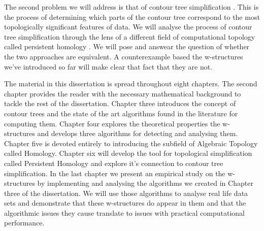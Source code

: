 The second problem we will address is that of contour tree simplification \cite{ct-branch-decomp}. This is the process of determining which parts of the contour tree correspond to the most topologically significant features of data. We will analyse the process of contour tree simplification through the lens of a different field of computational topology called persistent homology \cite{ph-a-survey}. We will pose and answear the question of whether the two approaches are equivalent. A counterexample based the w-structures we've introduced so far will make clear that fact that they are not.

The material in this dissertation is spread throughout eight chapters. The second chapter provides the reader with the necessary mathematical background to tackle the rest of the dissertation. Chapter three introduces the concept of contour trees and the state of the art algorithms found in the literature for computing them. Chapter four explores the theoretical properties the w-structures and develops three algorithms for detecting and analysing them. Chapter five is devoted entirely to introducing the subfield of Algebraic Topology called Homology. Chapter six will develop the tool for topological simplification called Persistent Homology and explore it's connection to contour tree simplification. In the last chapter we present an empirical study on the w-structures by implementing and analysing the algorithms we created in Chapter three of the dissertation. We will use those algorithms to analyse real life data sets and demonstrate that these w-structures do appear in them and that the algorithmic issues they cause translate to issues with practical computational performance.
